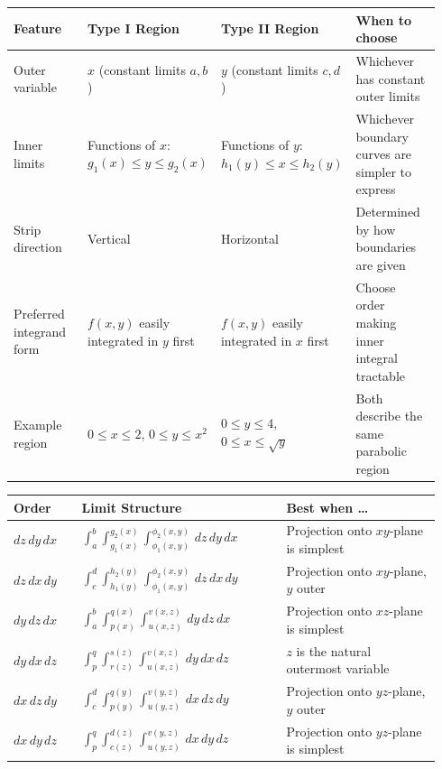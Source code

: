 \documentclass[12pt,a4paper]{article}
\begin{document}
\begin{center}
\begin{tabular}{@{}p{0.22\linewidth} p{0.24\linewidth} p{0.24\linewidth} p{0.24\linewidth}@{}}
\toprule
\textbf{Feature} & \textbf{Type I Region} & \textbf{Type II Region} & \textbf{When to choose} \\
\midrule
Outer variable & \(x\) (constant limits \(a,b\)) & \(y\) (constant limits \(c,d\)) & Whichever has constant outer limits \\[3pt]
Inner limits & Functions of \(x\): \(g_1(x) \le y \le g_2(x)\) & Functions of \(y\): \(h_1(y) \le x \le h_2(y)\) & Whichever boundary curves are simpler to express \\[3pt]
Strip direction & Vertical & Horizontal & Determined by how boundaries are given \\[3pt]
Preferred integrand form & \(f(x,y)\) easily integrated in \(y\) first & \(f(x,y)\) easily integrated in \(x\) first & Choose order making inner integral tractable \\[3pt]
Example region & \(0\le x\le 2\), \(0\le y\le x^2\) & \(0\le y\le 4\), \(0\le x\le \sqrt{y}\) & Both describe the same parabolic region \\
\bottomrule
\end{tabular}
\end{center}

\vspace{10pt}

\begin{center}
\begin{tabular}{@{}p{0.15\linewidth} p{0.45\linewidth} p{0.34\linewidth}@{}}
\toprule
\textbf{Order} & \textbf{Limit Structure} & \textbf{Best when \ldots} \\
\midrule
\(dz\,dy\,dx\) & \(\int_a^b\int_{g_1(x)}^{g_2(x)}\int_{\phi_1(x,y)}^{\phi_2(x,y)}\,dz\,dy\,dx\) & Projection onto \(xy\)-plane is simplest \\[3pt]
\(dz\,dx\,dy\) & \(\int_c^d\int_{h_1(y)}^{h_2(y)}\int_{\phi_1(x,y)}^{\phi_2(x,y)}\,dz\,dx\,dy\) & Projection onto \(xy\)-plane, \(y\) outer \\[3pt]
\(dy\,dz\,dx\) & \(\int_a^b\int_{p(x)}^{q(x)}\int_{u(x,z)}^{v(x,z)}\,dy\,dz\,dx\) & Projection onto \(xz\)-plane is simplest \\[3pt]
\(dy\,dx\,dz\) & \(\int_p^q\int_{r(z)}^{s(z)}\int_{u(x,z)}^{v(x,z)}\,dy\,dx\,dz\) & \(z\) is the natural outermost variable \\[3pt]
\(dx\,dz\,dy\) & \(\int_c^d\int_{p(y)}^{q(y)}\int_{u(y,z)}^{v(y,z)}\,dx\,dz\,dy\) & Projection onto \(yz\)-plane, \(y\) outer \\[3pt]
\(dx\,dy\,dz\) & \(\int_p^q\int_{c(z)}^{d(z)}\int_{u(y,z)}^{v(y,z)}\,dx\,dy\,dz\) & Projection onto \(yz\)-plane is simplest \\
\bottomrule
\end{tabular}
\end{center}
\end{document}
